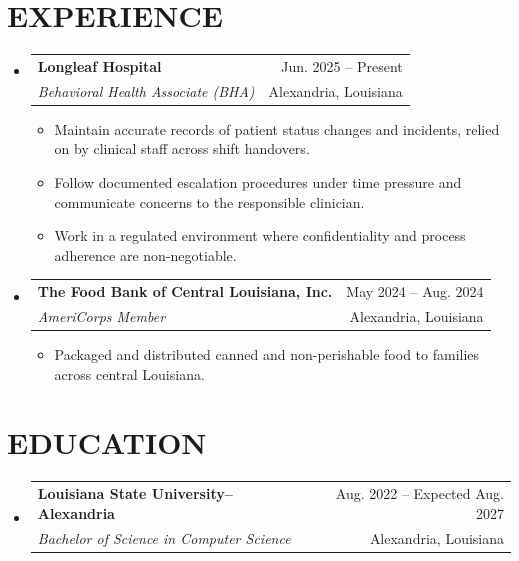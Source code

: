 \documentclass[letterpaper,11pt]{article}
\makeatletter
\newcommand{\resumeItem}[1]{
  \item\small{{#1 \vspace{-1pt}}}
}
\newcommand{\resumeSubheading}[4]{
  \vspace{-1pt}\item
  \begin{tabular*}{\textwidth}[t]{l@{\extracolsep{\fill}}r}
    \textbf{#1} & {\color{dark-grey}\small #2}\vspace{1pt}\\
    \textit{#3} & {\color{dark-grey}\small #4}\\
  \end{tabular*}\vspace{-4pt}
}
\newcommand{\resumeSubHeadingListStart}{\begin{itemize}[leftmargin=0in,label={}]}
\newcommand{\resumeSubHeadingListEnd}{\end{itemize}}
\newcommand{\resumeItemListStart}{\begin{itemize}}
\newcommand{\resumeItemListEnd}{\end{itemize}\vspace{-3pt}}
\makeatother
\begin{document}
\section{EXPERIENCE}
\resumeSubHeadingListStart
  \resumeSubheading
    {Longleaf Hospital}{Jun. 2025 -- Present}
    {Behavioral Health Associate (BHA)}{Alexandria, Louisiana}
  \resumeItemListStart
    \resumeItem{Maintain accurate records of patient status changes and incidents, relied on by clinical staff across shift handovers.}
    \resumeItem{Follow documented escalation procedures under time pressure and communicate concerns to the responsible clinician.}
    \resumeItem{Work in a regulated environment where confidentiality and process adherence are non-negotiable.}
  \resumeItemListEnd

  \resumeSubheading
    {The Food Bank of Central Louisiana, Inc.}{May 2024 -- Aug. 2024}
    {AmeriCorps Member}{Alexandria, Louisiana}
  \resumeItemListStart
    \resumeItem{Packaged and distributed canned and non-perishable food to families across central Louisiana.}
  \resumeItemListEnd
\resumeSubHeadingListEnd

\section{EDUCATION}
\resumeSubHeadingListStart
  \resumeSubheading
    {Louisiana State University--Alexandria}{Aug. 2022 -- Expected Aug. 2027}
    {Bachelor of Science in Computer Science}{Alexandria, Louisiana}
\resumeSubHeadingListEnd
\end{document}
